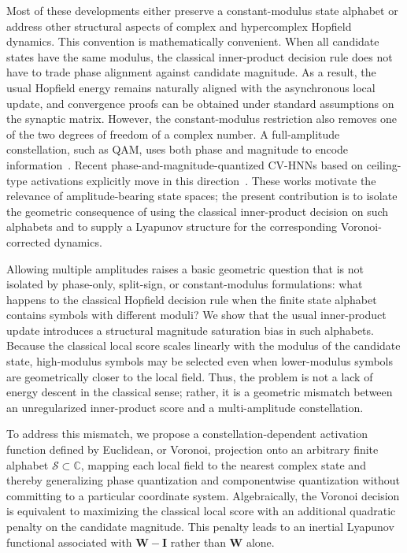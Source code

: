 \documentclass[10pt,journal,letterpaper]{IEEEtran}
\begin{document}
Most of these developments either preserve a constant-modulus state alphabet or address other structural aspects of complex and hypercomplex Hopfield dynamics. This convention is mathematically convenient. When all candidate states have the same modulus, the classical inner-product decision rule does not have to trade phase alignment against candidate magnitude. As a result, the usual Hopfield energy remains naturally aligned with the asynchronous local update, and convergence proofs can be obtained under standard assumptions on the synaptic matrix. However, the constant-modulus restriction also removes one of the two degrees of freedom of a complex number. A full-amplitude constellation, such as QAM, uses both phase and magnitude to encode information~\cite{proakis2008}. Recent phase-and-magnitude-quantized CV-HNNs based on ceiling-type activations explicitly move in this direction~\cite{garimella2025}. These works motivate the relevance of amplitude-bearing state spaces; the present contribution is to isolate the geometric consequence of using the classical inner-product decision on such alphabets and to supply a Lyapunov structure for the corresponding Voronoi-corrected dynamics.

Allowing multiple amplitudes raises a basic geometric question that is not isolated by phase-only, split-sign, or constant-modulus formulations: what happens to the classical Hopfield decision rule when the finite state alphabet contains symbols with different moduli? We show that the usual inner-product update introduces a structural magnitude saturation bias in such alphabets. Because the classical local score scales linearly with the modulus of the candidate state, high-modulus symbols may be selected even when lower-modulus symbols are geometrically closer to the local field. Thus, the problem is not a lack of energy descent in the classical sense; rather, it is a geometric mismatch between an unregularized inner-product score and a multi-amplitude constellation.

To address this mismatch, we propose a constellation-dependent activation
function defined by Euclidean, or Voronoi, projection onto an arbitrary finite
alphabet $\mathcal{S}\subset\mathbb{C}$, mapping each local field
to the nearest complex state and thereby generalizing phase quantization and
componentwise quantization without committing to a particular coordinate
system. Algebraically, the Voronoi decision is equivalent to maximizing the
classical local score with an additional quadratic penalty on the candidate
magnitude. This penalty leads to an inertial Lyapunov functional associated
with $\boldsymbol{W}-\boldsymbol{I}$ rather than $\boldsymbol{W}$ alone.
\end{document}
